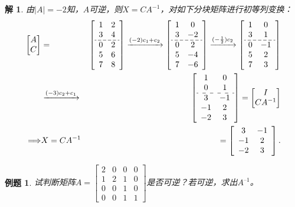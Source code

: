 \documentclass[a4paper]{book}
\newtheorem{eg}{例题}[chapter]
\newtheorem*{solution}{解}
\begin{document}
\begin{solution}
由$|A|=-2$知，$A$可逆，则$X=CA^{-1}$，对如下分块矩阵进行初等列变换：
\begin{eqnarray*}
\begin{bmatrix} A \\ C \end{bmatrix} & = &
  \setlength{\dashlinegap}{2pt}
  \left[ \begin{array}{cc}
    1 & 2 \\ 3 & 4 \\ \hdashline  0 & 2 \\ 5 & 6 \\ 7 & 8 \end{array} \right]
  \xrightarrow{(-2)c_1+c_2}
  \left[ \begin{array}{cc}
    1 & 0 \\ 3 & -2 \\ \hdashline  0 & 2 \\ 5 & -4 \\ 7 & -6 \end{array} \right]
  \xrightarrow{(-\frac12)c_2}
  \left[ \begin{array}{cc}
    1 & 0 \\ 3 & 1 \\ \hdashline  0 & -1 \\ 5 & 2 \\ 7 & 3 \end{array} \right] \\
  & \xrightarrow{(-3)c_2 + c_1} &
  \left[ \begin{array}{cc}
    1 & 0 \\ 0 & 1 \\ \hdashline  3 & -1 \\ -1 & 2 \\ -2 & 3 \end{array} \right]
  = \begin{bmatrix} I \\ CA^{-1} \end{bmatrix} \\
\Longrightarrow & X=CA^{-1} & = \left[ \begin{array}{cc}
    3 & -1 \\ -1 & 2 \\ -2 & 3 \end{array} \right].
\end{eqnarray*}
\end{solution}

\begin{eg}
试判断矩阵$A = \begin{bmatrix} 2 & 0 & 0 & 0 \\ 1 & 2 & 1 & 0 \\ 0 & 0 & 1 & 0 \\ 0 & 0 & 1 & 1 \end{bmatrix}$是否可逆？若可逆，求出$A^{–1}$。
\end{eg}
\end{document}
